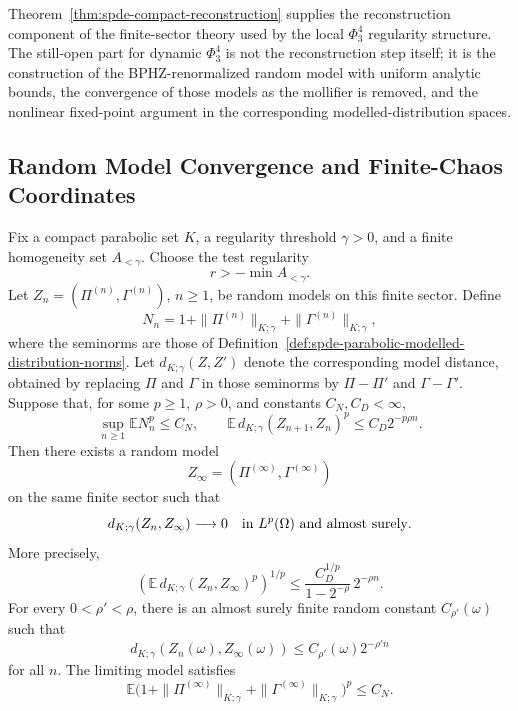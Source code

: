 Theorem~\ref{thm:spde-compact-reconstruction} supplies the reconstruction
component of the finite-sector theory used by the local \(\Phi^4_3\)
regularity structure.  The still-open part for dynamic \(\Phi^4_3\) is not
the reconstruction step itself; it is the construction of the
BPHZ-renormalized random model with uniform analytic bounds, the convergence
of those models as the mollifier is removed, and the nonlinear fixed-point
argument in the corresponding modelled-distribution spaces.

\subsection{Random Model Convergence and Finite-Chaos Coordinates}
\label{subsec:spde-random-models-chaos-coordinates}

\begin{lemma}
\label{lem:spde-random-model-cauchy-criterion}
Fix a compact parabolic set \(K\), a regularity threshold \(\gamma>0\), and a
finite homogeneity set \(A_{<\gamma}\).  Choose the test regularity
\[
  r>-\min A_{<\gamma}.
\]
Let \(Z_n=(\Pi^{(n)},\Gamma^{(n)})\), \(n\geq1\), be random models on this
finite sector.  Define
\[
  N_n=
  1+\|\Pi^{(n)}\|_{K;\gamma}+\|\Gamma^{(n)}\|_{K;\gamma},
\]
where the seminorms are those of
Definition~\ref{def:spde-parabolic-modelled-distribution-norms}.  Let
\(d_{K;\gamma}(Z,Z')\) denote the corresponding model distance, obtained by
replacing \(\Pi\) and \(\Gamma\) in those seminorms by
\(\Pi-\Pi'\) and \(\Gamma-\Gamma'\).  Suppose that, for some
\(p\geq1\), \(\rho>0\), and constants \(C_N,C_D<\infty\),
\begin{equation}
  \sup_{n\geq1}\mathbb E N_n^p\leq C_N,
  \qquad
  \mathbb E\,d_{K;\gamma}(Z_{n+1},Z_n)^p\leq C_D2^{-p\rho n}.
  \label{eq:spde-random-model-cauchy-hypotheses}
\end{equation}
Then there exists a random model
\[
  Z_\infty=(\Pi^{(\infty)},\Gamma^{(\infty)})
\]
on the same finite sector such that
\[
  d_{K;\gamma}(Z_n,Z_\infty)\longrightarrow0
  \quad\hbox{in }L^p(\Omega)\hbox{ and almost surely}.
\]
More precisely,
\begin{equation}
  \left(
    \mathbb E\,d_{K;\gamma}(Z_n,Z_\infty)^p
  \right)^{1/p}
  \leq
  \frac{C_D^{1/p}}{1-2^{-\rho}}\,2^{-\rho n}.
  \label{eq:spde-random-model-lp-tail}
\end{equation}
For every \(0<\rho'<\rho\), there is an almost surely finite random constant
\(C_{\rho'}(\omega)\) such that
\begin{equation}
  d_{K;\gamma}(Z_n(\omega),Z_\infty(\omega))
  \leq
  C_{\rho'}(\omega)2^{-\rho'n}
  \label{eq:spde-random-model-almost-sure-tail}
\end{equation}
for all \(n\).  The limiting model satisfies
\[
  \mathbb E
  \bigl(
    1+\|\Pi^{(\infty)}\|_{K;\gamma}
     +\|\Gamma^{(\infty)}\|_{K;\gamma}
  \bigr)^p
  \leq C_N .
\]
\end{lemma}

